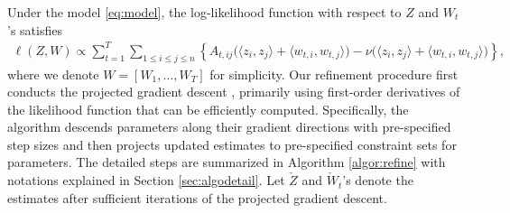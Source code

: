 \documentclass[12pt]{article}
\newcommand{\red}[1]{\textcolor{red}{#1}}
\begin{document}

Under the model \eqref{eq:model}, the log-likelihood function with respect to $Z$ and $W_t$'s satisfies
\begin{align}\label{eq:zwlikelihood}
    \ell(Z, W) \propto  \sum_{t=1}^T\sum_{1 \leqslant i \leqslant j \leqslant n}\left\{A_{t, i j}\big( \langle z_i, z_j\rangle + \langle w_{t,i}, w_{t,j}\rangle \big)-\nu \big(\langle z_i, z_j\rangle + \langle w_{t,i}, w_{t,j}\rangle \big)\right\}, 
\end{align}
where we denote $W = [W_1, \ldots, W_T]$ for simplicity.
Our refinement procedure  first conducts the projected gradient descent \citep{chen2015fast}, primarily using first-order derivatives of the likelihood function that can be efficiently computed. Specifically,  the algorithm descends  parameters along their gradient directions with pre-specified step sizes 
 and then projects  updated estimates to  pre-specified constraint sets for parameters. 
  The detailed  steps are summarized in Algorithm  \ref{algor:refine} with notations explained in Section \ref{sec:algodetail}.   
Let $\check{Z}$ and $\check{W}_t$'s denote the estimates 
after sufficient iterations of the projected gradient descent.

\end{document}
